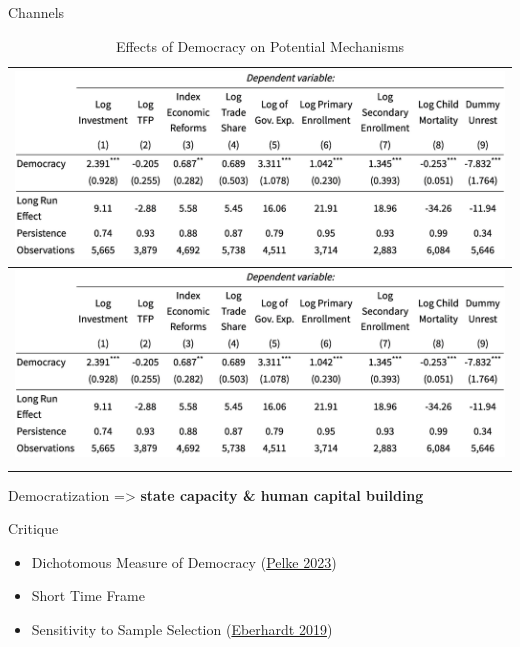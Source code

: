 \documentclass[
  ignorenonframetext,
]{beamer}
\providecommand{\tightlist}{%
  \setlength{\itemsep}{0pt}\setlength{\parskip}{0pt}}\usepackage{longtable,booktabs,array}
\begin{document}
\begin{frame}{Channels}
\protect\hypertarget{channels}{}
\begin{longtable}[]{@{}l@{}}
\caption{Effects of Democracy on Potential Mechanisms}\tabularnewline
\toprule\noalign{}
\includegraphics{output/Table_Channels.jpg} \\
\midrule\noalign{}
\endfirsthead
\toprule\noalign{}
\includegraphics{output/Table_Channels.jpg} \\
\midrule\noalign{}
\endhead
\bottomrule\noalign{}
\end{longtable}

Democratization =\textgreater{} \textbf{state capacity \& human capital
building}
\end{frame}

\begin{frame}{Critique}
\protect\hypertarget{critique}{}
\begin{itemize}
\tightlist
\item
  Dichotomous Measure of Democracy
  (\protect\hyperlink{ref-pelkeReanalysingLinkDemocracy2023}{Pelke
  2023})
\item
  Short Time Frame
\item
  Sensitivity to Sample Selection
  (\protect\hyperlink{ref-eberhardtDemocracyDoesCause2019}{Eberhardt
  2019})
\end{itemize}
\end{frame}
\end{document}
